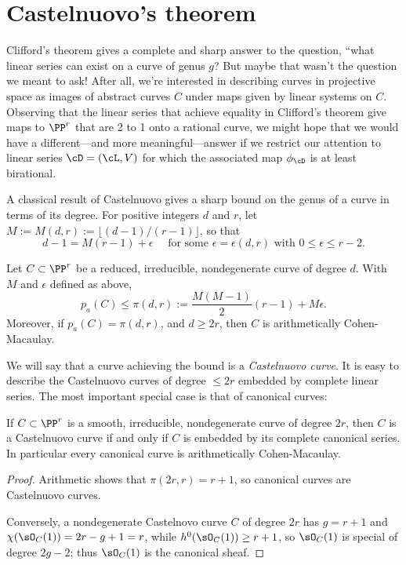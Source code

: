  \section{Castelnuovo's theorem}

Clifford's theorem gives a complete and sharp answer to the question, ``what linear series can exist on a curve of genus $g$?
But maybe that wasn't the question we meant to ask! After all, we're interested in describing curves in projective space as images of abstract curves $C$ under maps given by linear systems on $C$. Observing that the linear series that achieve equality in Clifford's theorem give maps to $\PP^r$ that are 2 to 1 onto a rational curve, we might hope that we would have a different---and more meaningful---answer if we  restrict our attention to linear series $\cD = (\cL,V)$ for which the associated map $\phi_\cD$ is at least  birational. 

A classical result of Castelnuovo gives a sharp bound on the genus of a curve in terms of its degree. For positive integers $d$ and $r$, let $M := M(d,r) := \lfloor(d-1)/(r-1)\rfloor$, so that
$$
 d -1 = M(r-1) + \epsilon \quad \text{ for some $\epsilon = \epsilon(d,r)$ with }0 \leq \epsilon \leq r-2. 
$$

\begin{theorem}\label{Castelnuovo's bound}
Let $C \subset \PP^r$ be a reduced, irreducible, nondegenerate curve of degree $d$. With $M$ and $\epsilon$ defined
as above,
$$
p_a(C) \leq \pi(d,r) := \frac{M(M-1)}{2}(r-1) + M\epsilon.
$$
Moreover, if $p_a(C) = \pi(d,r)$, and $d\geq 2r$,  then $C$ is arithmetically Cohen-Macaulay. 
\end{theorem}

We will say that a curve achieving the bound is a \emph{Castelnuovo curve}.  It is easy to describe the Castelnuovo
curves of degree $\leq 2r$ embedded by complete linear series. The most important special case is that of canonical curves:

\begin{corollary}\label{canonical ACM}
If $C \subset \PP^r$ is a smooth, irreducible, nondegenerate curve of degree $2r$, then $C$ is a Castelnuovo curve if and only if $C$ is embedded by its complete canonical series. In particular every canonical curve is
arithmetically Cohen-Macaulay.
\end{corollary}

\begin{proof}
Arithmetic shows that $\pi(2r,r) = r+1$, so canonical curves are Castelnuovo curves. 

Conversely, a nondegenerate Castelnovo curve $C$
of degree $2r$ has $g=r+1$ and $\chi(\sO_C(1)) = 2r - g+1 = r$, while $h^0(\sO_C(1)) \geq r+1$, so $\sO_C(1)$ is special of 
degree $2g-2$; thus $\sO_C(1)$ is the canonical sheaf.
\end{proof}

